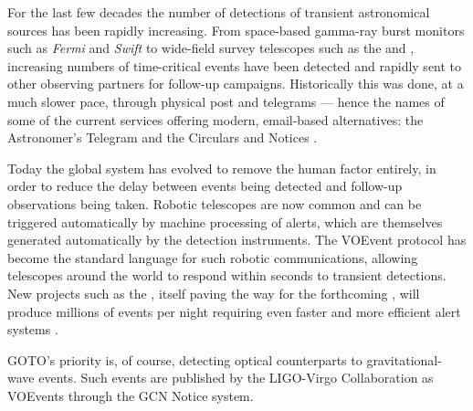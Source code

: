 \begin{colsection}

For the last few decades the number of detections of transient astronomical sources has been rapidly increasing. From space-based gamma-ray burst monitors such as \textit{Fermi} and \textit{Swift} to wide-field survey telescopes such as the  and , increasing numbers of time-critical events have been detected and rapidly sent to other observing partners for follow-up campaigns. Historically this was done, at a much slower pace, through physical post and telegrams --- hence the names of some of the current services offering modern, email-based alternatives: the Astronomer's Telegram \citep{ATel} and the  Circulars and Notices \citep{GCN}.

Today the global system has evolved to remove the human factor entirely, in order to reduce the delay between events being detected and follow-up observations being taken. Robotic telescopes are now common and can be triggered automatically by machine processing of alerts, which are themselves generated automatically by the detection instruments. The  VOEvent protocol \citep{voevent} has become the standard language for such robotic communications, allowing telescopes around the world to respond within seconds to transient detections. New projects such as the , itself paving the way for the forthcoming , will produce millions of events per night requiring even faster and more efficient alert systems \citep{ZTF_alerts}.

GOTO's priority is, of course, detecting optical counterparts to gravitational-wave events. Such events are published by the LIGO-Virgo Collaboration as VOEvents through the GCN Notice system.

\newpage

\end{colsection}


